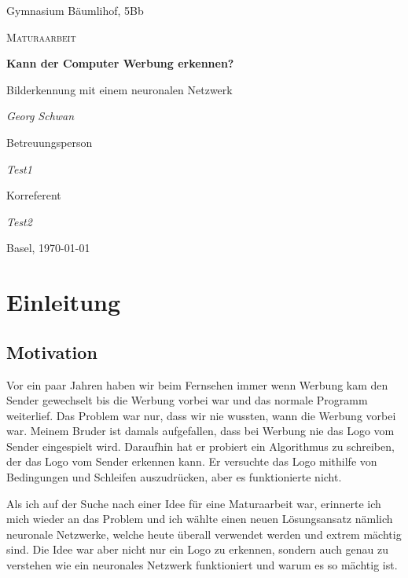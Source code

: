 \documentclass[12pt,a4paper]{report}
\begin{document}
\begin{titlepage}
	\centering
	{\Large Gymnasium Bäumlihof, 5Bb \par}
	\vspace{1cm}
	{\LARGE\scshape Maturaarbeit\par}
	\vspace{1.5cm}
	{\huge\bfseries Kann der Computer Werbung erkennen?\par}
	\vspace{0.6cm}
    {\Large Bilderkennung mit einem neuronalen Netzwerk\par}
	\vspace{2cm}
	{\Large\itshape Georg Schwan\par}
	\vfill
	Betreuungsperson\par
	{\itshape Test1\par}
	Korreferent\par
	{\itshape Test2}
	\vfill
	{\large Basel, \today\par}
\end{titlepage}

\tableofcontents

\newpage

\chapter{Einleitung}\label{ch:einleitung}

\section{Motivation}
\label{sec:motivation}
Vor ein paar Jahren haben wir beim Fernsehen immer wenn Werbung kam den Sender gewechselt
bis die Werbung vorbei war und das normale Programm weiterlief.
Das Problem war nur, dass wir nie wussten, wann die Werbung vorbei war.
Meinem Bruder ist damals aufgefallen, dass bei Werbung nie das Logo vom Sender eingespielt wird.
Daraufhin hat er probiert ein Algorithmus zu schreiben, der das Logo vom Sender erkennen kann.
Er versuchte das Logo mithilfe von Bedingungen und Schleifen auszudrücken, aber es funktionierte nicht.

Als ich auf der Suche nach einer Idee für eine Maturaarbeit war, erinnerte ich mich wieder an das Problem und ich wählte einen neuen Lösungsansatz
nämlich neuronale Netzwerke, welche heute überall verwendet werden und extrem mächtig sind.
Die Idee war aber nicht nur ein Logo zu erkennen, sondern auch genau zu verstehen wie ein neuronales Netzwerk funktioniert und warum es so mächtig ist.
\end{document}
